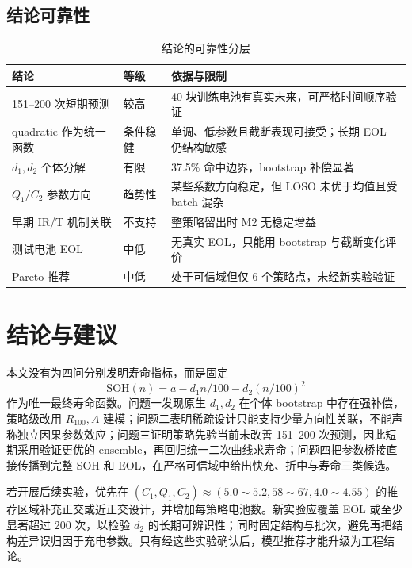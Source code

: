 \documentclass[UTF8,a4paper,zihao=-4]{ctexart}
\newcommand{\SOH}{\mathrm{SOH}}
\newcommand{\Rone}{R_{100}}
\begin{document}
\subsection{结论可靠性}

\begin{table}[H]
\centering
\caption{结论的可靠性分层}
\begin{tabularx}{0.94\textwidth}{p{3.0cm}p{2.3cm}X}
\toprule
结论 & 等级 & 依据与限制 \\
\midrule
151--200 次短期预测 & 较高 & 40 块训练电池有真实未来，可严格时间顺序验证 \\
quadratic 作为统一函数 & 条件稳健 & 单调、低参数且截断表现可接受；长期 EOL 仍结构敏感 \\
$d_1,d_2$ 个体分解 & 有限 & 37.5\% 命中边界，bootstrap 补偿显著 \\
$Q_1/C_2$ 参数方向 & 趋势性 & 某些系数方向稳定，但 LOSO 未优于均值且受 batch 混杂 \\
早期 IR/T 机制关联 & 不支持 & 整策略留出时 M2 无稳定增益 \\
测试电池 EOL & 中低 & 无真实 EOL，只能用 bootstrap 与截断变化评价 \\
Pareto 推荐 & 中低 & 处于可信域但仅 6 个策略点，未经新实验验证 \\
\bottomrule
\end{tabularx}
\end{table}

\section{结论与建议}

本文没有为四问分别发明寿命指标，而是固定
\[
  \SOH(n)=a-d_1n/100-d_2(n/100)^2
\]
作为唯一最终寿命函数。问题一发现原生 $d_1,d_2$ 在个体 bootstrap 中存在强补偿，策略级改用 $\Rone,A$ 建模；问题二表明稀疏设计只能支持少量方向性关联，不能声称独立因果参数效应；问题三证明策略先验当前未改善 151--200 次预测，因此短期采用验证更优的 ensemble，再回归统一二次曲线求寿命；问题四把参数桥接直接传播到完整 SOH 和 EOL，在严格可信域中给出快充、折中与寿命三类候选。

若开展后续实验，优先在 $(C_1,Q_1,C_2)\approx(5.0\!\sim\!5.2,58\!\sim\!67,4.0\!\sim\!4.55)$ 的推荐区域补充正交或近正交设计，并增加每策略电池数。新实验应覆盖 EOL 或至少显著超过 200 次，以检验 $d_2$ 的长期可辨识性；同时固定结构与批次，避免再把结构差异误归因于充电参数。只有经这些实验确认后，模型推荐才能升级为工程结论。
\end{document}
